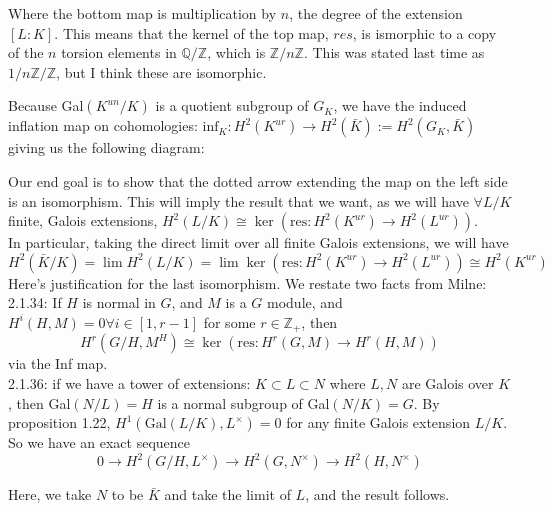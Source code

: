 Where the bottom map is multiplication by $n$, the degree of the extension $[L:K]$. This means that the kernel of the top map, $res$, is ismorphic to a copy of the $n$ torsion elements in $\mathbb{Q}/\mathbb{Z}$, which is $\mathbb{Z}/n\mathbb{Z}$. This was stated last time as $1/n\mathbb{Z}/\mathbb{Z}$, but I think these are isomorphic. 

Because Gal$(K^{un}/K)$ is a quotient subgroup of $G_K$, we have the induced inflation map on cohomologies: $\text{inf}_K:H^2(K^{ur})\rightarrow H^2(\bar{K}):=H^2(G_K,\bar{K})$ giving us the following diagram: 

\begin{center}
\end{center}

Our end goal is to show that the dotted arrow extending the map on the left side is an isomorphism. This will imply the result that we want, as we will have $\forall L/K$ finite, Galois extensions, $H^2(L/K)\cong \ker(\text{res}: H^2(K^{ur})\rightarrow H^2(L^{ur}))$.\\
In particular, taking the direct limit over all finite Galois extensions, we will have $$H^2(\bar{K}/K)=\lim H^2(L/K)=\lim \ker(\text{res}: H^2(K^{ur})\rightarrow H^2(L^{ur})) \cong H^2(K^{ur})$$ Here's justification for the last isomorphism. We restate two facts from Milne: \\
2.1.34: If $H$ is normal in $G$, and $M$ is a $G$ module, and $H^i(H, M)=0 \forall i\in [1, r-1]$ for some $r\in\mathbb{Z}_+$, then
$$H^r(G/H, M^H)\cong \ker(\text{res}:H^r(G,M)\rightarrow H^r(H,M))$$ via the Inf map. \\
2.1.36: if we have a tower of extensions: $K\subset L\subset N$ where $L, N$ are Galois over $K$, then Gal$(N/L)=H$ is a normal subgroup of Gal$(N/K)=G$. By proposition 1.22, $H^1(\text{Gal}(L/K), L^\times)=0$ for any finite Galois extension $L/K$. So we have an exact sequence
$$0\rightarrow H^2(G/H, L^\times)\rightarrow H^2(G, N^\times)\rightarrow H^2(H, N^\times)$$

Here, we take $N$ to be $\bar{K}$ and take the limit of $L$, and the result follows. 

